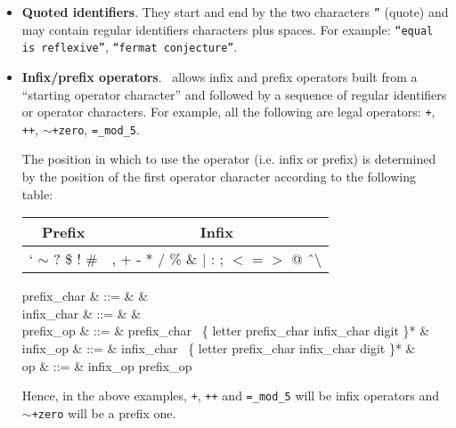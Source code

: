 \begin{itemize}
  \item {\bf Quoted identifiers}.
    They start and end by the two characters {\tt ''} (quote) and may
    contain regular identifiers characters plus spaces. For example:
    {\tt ``equal is reflexive''}, {\tt ``fermat conjecture''}.
  \item {\bf Infix/prefix operators}.
    \focal\ allows infix and prefix operators built from a
    ``starting operator character'' and followed by a sequence of
    regular identifiers or operator characters. For example, all the
    following are legal operators: 
    {\tt +}, {\tt ++}, {\tt $\sim$+zero}, {\tt =\_mod\_5}.

    The position in which to use the operator (i.e. infix or prefix)
    is determined by the position of the first operator character
    according to the following table:
    \begin{center}
    \begin{tabular}{|c|c|}
    \hline
    Prefix & Infix \\
    \hline
    ` $\sim$ ? \$ ! \#                            &
    , + - * / \% \& $|$ : ; $<$ = $>$ @ \^\ $\setminus$ \\
    \hline
    \end{tabular}
    \end{center}

    \begin{syntax}
    prefix\_char & ::= & & \\
    infix\_char & ::= &
         & \\
    prefix\_op & ::= & prefix\_char
        \ \{ letter \mid prefix\_char \mid infix\_char
        \mid digit \mid \terminal{\_} \}* & \\
    infix\_op & ::= & infix\_char
        \ \{ letter \mid prefix\_char \mid infix\_char
        \mid digit \mid \terminal{\_} \}* & \\
    op & ::= & infix\_op \mid prefix\_op
    \end{syntax}

    Hence, in the above examples, {\tt +}, {\tt ++} and
    {\tt =\_mod\_5} will be infix operators and {\tt $\sim$+zero} will
    be a prefix one.


\end{itemize}
